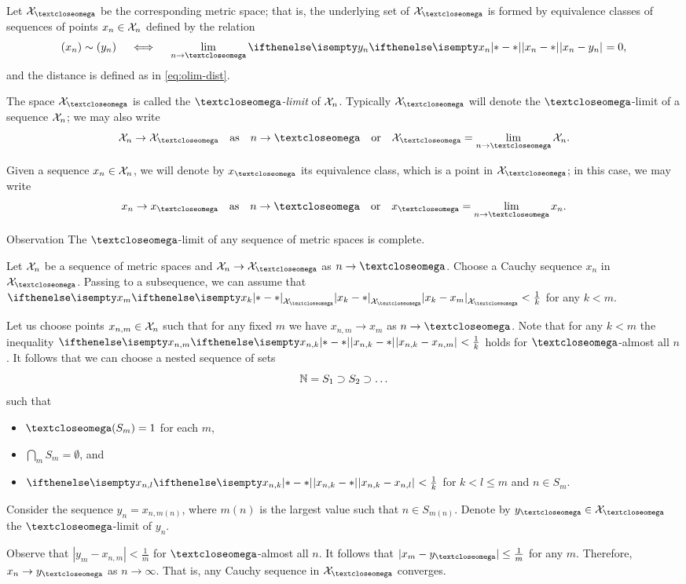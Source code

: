 Let $\spc{X}_\o$ be the corresponding metric space; 
that is, the underlying set of $\spc{X}_\o$ is formed by equivalence  classes of sequences of points $x_n\in\spc{X}_n$ 
defined by the relation
\[(x_n)\sim(y_n)
\quad \iff\quad 
\lim_{n\to\o} \dist{x_n}{y_n}{}=0,\]
and the distance is defined as in \ref{eq:olim-dist}.

The space $\spc{X}_\o$ is called the \emph{$\o$-limit} of $\mathcal{X}_n$.
Typically  $\spc{X}_\o$ will denote the  
$\o$-limit of a sequence $\mathcal{X}_n$;
we may also write  
\[\spc{X}_n\to\spc{X}_\o\quad \text{as}\quad  n\to\o\quad \text{or}\quad \spc{X}_\o=\lim_{n\to\o}\spc{X}_n.\]

Given a sequence  $x_n\in \spc{X}_n$,
we will denote by $x_\o$ its equivalence class, which is a point in $\spc{X}_\o$;
in this case, we may write
\[x_n\to x_\o \quad \text{as}\quad  n\to\o\quad \text{or}\quad x_\o=\lim_{n\to\o} x_n.\]

\begin{thm}{Observation}\label{obs:ultralimit-is-complete}
The $\o$-limit of any sequence of metric spaces is complete. 
\end{thm}

Let $\mathcal{X}_n$ be a sequence of metric spaces and $\spc{X}_n\to\spc{X}_\o$ as $n\to\o$.
Choose a Cauchy sequence $x_n$ in $\spc{X}_\o$.
Passing to a subsequence, we can assume that $\dist{x_k}{x_{m}}{\spc{X}_\o}<\tfrac1{k}$ for any $k<m$.

Let us choose points $x_{n,m}\in\spc{X}_n$ such that for any fixed $m$ we have $x_{n,m}\to x_m$ as $n\to\o$.
Note that for any $k<m$ the inequality $\dist{x_{n,k}}{x_{n,m}}{}<\tfrac1{k}$ holds for $\o$-almost all $n$.
It follows that we can choose a nested sequence of sets 
\[\NN= S_1\supset S_2\supset\dots\] 
such that 
\begin{itemize}
\item $\o(S_m)=1$ for each $m$, 
\item $\bigcap_m S_m=\emptyset$, and
\item $\dist{x_{n,k}}{x_{n,l}}{}<\tfrac1{k}$ for $k<l\le m$ and $n\in S_m$.
\end{itemize}

Consider the sequence $y_n=x_{n,m(n)}$, where $m(n)$ is the largest value such that $n\in S_{m(n)}$.
Denote by $y_\o\in \spc{X}_\o$ the $\o$-limit of $y_n$.

Observe that $|y_m-x_{n,m}|<\tfrac1{m}$ for $\o$-almost all $n$.
It follows that $|x_m-y_\o|\le \tfrac1{m}$ for any $m$.
Therefore, $x_n\to y_\o$ as $n\to \infty$.
That is, any Cauchy sequence in $\spc{X}_\o$ converges.
\qeds


